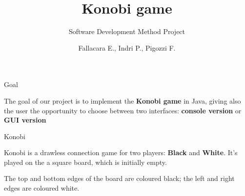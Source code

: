 \documentclass{beamer}
\title{Konobi game}
\subtitle{Software Development Method Project}
\author{Fallacara E., Indri P., Pigozzi F.}
\date{}
\begin{document}
	\setcounter{showSlideNumbers}{0}

	\frame{\titlepage}

	\setcounter{framenumber}{0}
	\setcounter{showSlideNumbers}{1}



  \begin{frame}{Goal}

    \begin{center}
      The goal of our project is to implement the \textbf{Konobi game} in Java, giving also the user the opportunity to choose between two interfaces: \textbf{console version} or \textbf{GUI version}
    \end{center}

  \end{frame}



  \begin{frame}{Konobi}

    Konobi is a drawless connection game for two players: \textbf{Black}
    and \textbf{White}. It's played on the a square board, which is initially empty. 

    \vspace{1em}

    The top and bottom edges of the board are coloured black; the left and right edges are coloured white.

    \vspace{1em}

    \begin{centering}


    \end{centering}

  \end{frame}
\end{document}
